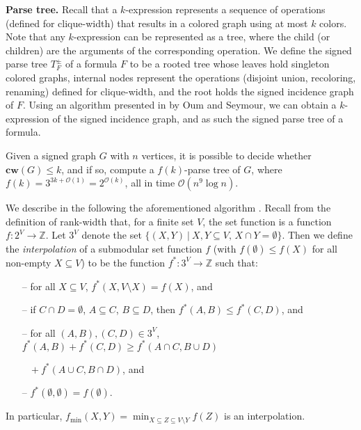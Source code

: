 \iffalse
\noindent
\textbf{Parse tree.}
Recall that a $k$-expression represents a sequence of operations (defined for clique-width) that results in a colored graph using at most $k$ colors.
Note that any $k$-expression can be represented as a tree, where the child (or children) are the arguments of the corresponding operation.
We define the signed parse tree $T^{\pm}_F$ of a formula $F$ to be a rooted tree whose leaves hold singleton colored graphs, internal nodes represent the operations (disjoint union, recoloring, renaming) defined for clique-width, and the root holds the signed incidence graph of $F$.
Using an algorithm presented in \cite{DBLP:journals/jct/OumS06} by Oum and Seymour, we can obtain a $k$-expression of the signed incidence graph, and as such the signed parse tree of a formula.
\begin{lemma}
	Given a signed graph $G$ with $n$ vertices, it is possible to decide whether $\mathbf{cw}(G) \leq k$, and if so, compute a $f(k)$-parse tree of $G$, where $f(k) = 3^{3k+\mathcal{O}(1)} = 2^{\mathcal{O}(k)}$, all in time $\mathcal{O}(n^9 \log n)$.
\end{lemma}
We describe in the following the aforementioned algorithm \cite{DBLP:journals/jct/OumS06}.
Recall from the definition of rank-width that, for a finite set $V$, the set function is a function $f : 2^V \rightarrow \mathbb{Z}$.
Let $3^V$ denote the set $\{ (X,Y) \ | \ X,Y \subseteq V,\, X \cap Y = \emptyset \}$.
Then we define the {\em interpolation} of a submodular set function $f$ (with $f(\emptyset) \leq f(X)$ for all non-empty $X \subseteq V$) to be the function $f^* : 3^V \rightarrow \mathbb{Z}$ such that:
\begin{itemize}
	\item[--] for all $X \subseteq V$, $f^*(X, V \setminus X)=f(X)$, and
	\item[--] if $C \cap D = \emptyset$, $A \subseteq C$, $B \subseteq D$, then $f^*(A,B) \leq f^*(C,D)$, and
	\item[--] for all $(A,B),(C,D) \in 3^V$, $f^*(A,B)+f^*(C,D) \geq f^*(A \cap C, B \cup D)$ \vspace{-4pt}
	
	$\phantom{w} + f^*(A \cup C, B \cap D)$, and
	
	\item[--] $f^*(\emptyset, \emptyset) = f(\emptyset)$.
\end{itemize}

\noindent
In particular, $f_{\min}(X,Y) = \min_{X \subseteq Z \subseteq V\setminus Y} f(Z)$ is an interpolation. \\

